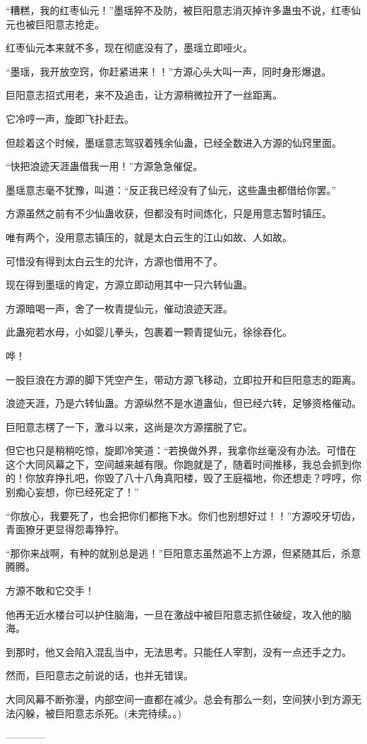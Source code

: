 \begin{this_body}
“糟糕，我的红枣仙元！”墨瑶猝不及防，被巨阳意志消灭掉许多蛊虫不说，红枣仙元也被巨阳意志抢走。

红枣仙元本来就不多，现在彻底没有了，墨瑶立即哑火。

“墨瑶，我开放空窍，你赶紧进来！！”方源心头大叫一声，同时身形爆退。

巨阳意志招式用老，来不及追击，让方源稍微拉开了一丝距离。

它冷哼一声，旋即飞扑赶去。

但趁着这个时候，墨瑶意志驾驭着残余仙蛊，已经全数进入方源的仙窍里面。

“快把浪迹天涯蛊借我一用！”方源急急催促。

墨瑶意志毫不犹豫，叫道：“反正我已经没有了仙元，这些蛊虫都借给你罢。”

方源虽然之前有不少仙蛊收获，但都没有时间炼化，只是用意志暂时镇压。

唯有两个，没用意志镇压的，就是太白云生的江山如故、人如故。

可惜没有得到太白云生的允许，方源也借用不了。

现在得到墨瑶的肯定，方源立即动用其中一只六转仙蛊。

方源暗喝一声，舍了一枚青提仙元，催动浪迹天涯。

此蛊宛若水母，小如婴儿拳头，包裹着一颗青提仙元，徐徐吞化。

哗！

一股巨浪在方源的脚下凭空产生，带动方源飞移动，立即拉开和巨阳意志的距离。

浪迹天涯，乃是六转仙蛊。方源纵然不是水道蛊仙，但已经六转，足够资格催动。

巨阳意志楞了一下，激斗以来，这尚是次方源摆脱了它。

但它也只是稍稍吃惊，旋即冷笑道：“若换做外界，我拿你丝毫没有办法。可惜在这个大同风幕之下，空间越来越有限。你跑就是了，随着时间推移，我总会抓到你的！你放弃挣扎吧，你毁了八十八角真阳楼，毁了王庭福地，你还想走？哼哼，你别痴心妄想，你已经死定了！”

“你放心，我要死了，也会把你们都拖下水。你们也别想好过！！”方源咬牙切齿，青面獠牙更显得怨毒狰狞。

“那你来战啊，有种的就别总是逃！”巨阳意志虽然追不上方源，但紧随其后，杀意腾腾。

方源不敢和它交手！

他再无近水楼台可以护住脑海，一旦在激战中被巨阳意志抓住破绽，攻入他的脑海。

到那时，他又会陷入混乱当中，无法思考。只能任人宰割，没有一点还手之力。

然而，巨阳意志之前说的话，也并无错误。

大同风幕不断弥漫，内部空间一直都在减少。总会有那么一刻，空间狭小到方源无法闪躲，被巨阳意志杀死。(未完待续。。)

------------

\end{this_body}

